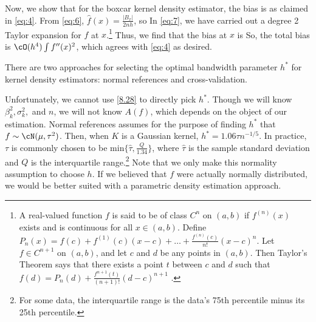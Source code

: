 Now, we show that for the boxcar kernel density estimator, the bias is as claimed in \eqref{eq:4}. From \eqref{eq:6}, $\hat{f}(x) = \frac{|B_x|}{2nh}$, so 
In \eqref{eq:7}, we have carried out a degree 2 Taylor expansion for $f$ at $x$.\footnote{A real-valued function $f$ is said to be of class $C^n$ on $(a, b)$ if $f^{(n)}(x)$ exists and is continuous for all $x \in (a, b)$. Define $P_n(x) = f(c) + f^{(1)}(c)(x-c) + \dots + \frac{f^{(n)}(c)}{n!}(x-c)^n$. Let $f \in C^{n+1}$ on $(a, b)$, and let $c$ and $d$ be any points in $(a,b)$. Then Taylor's Theorem says that there exists a point $t$ between $c$ and $d$ such that $f(d) = P_n(d) + \frac{f^{n+1}(t)}{(n+1)!}(d-c)^{n+1}$ \cite{johnsonbaugh_foundations_2010}.} Thus, we find that the bias at $x$ is 
So, the total bias is $\cO(h^4) \int f^{\prime \prime}(x)^2$, which agrees with \eqref{eq:4} as desired. 

 
There are two approaches for selecting the optimal bandwidth parameter $h^*$ for kernel density estimators: normal references and cross-validation. 

Unfortunately, we cannot use \eqref{8.28} to directly pick $h^*$. Though we will know $\beta_k^2, \sigma_k^2,$ and $n$, we will not know $A(f)$, which depends on the object of our estimation. Normal references assumes for the purpose of finding $h^*$ that $f \sim \cN(\mu, \tau^2)$. Then, when $K$ is a Gaussian kernel, $h^* = 1.06 \tau n^{-1/5}$. In practice, $\tau$ is commonly chosen to be $\text{min} \{\hat{\tau}, \tfrac{Q}{1.34}\}$, where $\hat{\tau}$ is the sample standard deviation and $Q$ is the interquartile range.\footnote{For some data, the interquartile range is the data's 75th percentile minus its 25th percentile.} Note that we only make this normality assumption to choose $h$. If we believed that $f$ were actually normally distributed, we would be better suited with a parametric density estimation approach.  

